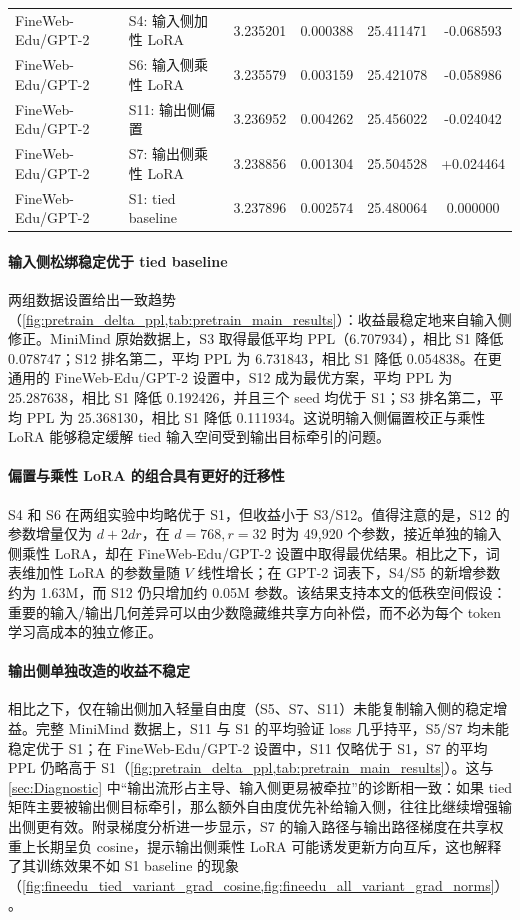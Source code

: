 \documentclass{article}
\theoremstyle{plain}
\theoremstyle{definition}
\theoremstyle{remark}
\begin{document}
\begin{table}[t]
\begin{small}
{\begin{tabular}{llcccc}
FineWeb-Edu/GPT-2 & S4: 输入侧加性 LoRA & 3.235201 & 0.000388 & 25.411471 & -0.068593 \\
FineWeb-Edu/GPT-2 & S6: 输入侧乘性 LoRA & 3.235579 & 0.003159 & 25.421078 & -0.058986 \\
FineWeb-Edu/GPT-2 & S11: 输出侧偏置 & 3.236952 & 0.004262 & 25.456022 & -0.024042 \\
FineWeb-Edu/GPT-2 & S7: 输出侧乘性 LoRA & 3.238856 & 0.001304 & 25.504528 & +0.024464 \\
FineWeb-Edu/GPT-2 & S1: tied baseline & 3.237896 & 0.002574 & 25.480064 & 0.000000 \\
\bottomrule
\end{tabular}
}
\end{small}
\end{table}

\paragraph{输入侧松绑稳定优于 tied baseline}
两组数据设置给出一致趋势（\cref{fig:pretrain_delta_ppl,tab:pretrain_main_results}）：收益最稳定地来自输入侧修正。MiniMind 原始数据上，S3 取得最低平均 PPL（6.707934），相比 S1 降低 0.078747；S12 排名第二，平均 PPL 为 6.731843，相比 S1 降低 0.054838。在更通用的 FineWeb-Edu/GPT-2 设置中，S12 成为最优方案，平均 PPL 为 25.287638，相比 S1 降低 0.192426，并且三个 seed 均优于 S1；S3 排名第二，平均 PPL 为 25.368130，相比 S1 降低 0.111934。这说明输入侧偏置校正与乘性 LoRA 能够稳定缓解 tied 输入空间受到输出目标牵引的问题。

\paragraph{偏置与乘性 LoRA 的组合具有更好的迁移性}
S4 和 S6 在两组实验中均略优于 S1，但收益小于 S3/S12。值得注意的是，S12 的参数增量仅为 $d+2dr$，在 $d=768,r=32$ 时为 49,920 个参数，接近单独的输入侧乘性 LoRA，却在 FineWeb-Edu/GPT-2 设置中取得最优结果。相比之下，词表维加性 LoRA 的参数量随 $V$ 线性增长；在 GPT-2 词表下，S4/S5 的新增参数约为 1.63M，而 S12 仍只增加约 0.05M 参数。该结果支持本文的低秩空间假设：重要的输入/输出几何差异可以由少数隐藏维共享方向补偿，而不必为每个 token 学习高成本的独立修正。

\paragraph{输出侧单独改造的收益不稳定}
相比之下，仅在输出侧加入轻量自由度（S5、S7、S11）未能复制输入侧的稳定增益。完整 MiniMind 数据上，S11 与 S1 的平均验证 loss 几乎持平，S5/S7 均未能稳定优于 S1；在 FineWeb-Edu/GPT-2 设置中，S11 仅略优于 S1，S7 的平均 PPL 仍略高于 S1（\cref{fig:pretrain_delta_ppl,tab:pretrain_main_results}）。这与 \cref{sec:Diagnostic} 中“输出流形占主导、输入侧更易被牵拉”的诊断相一致：如果 tied 矩阵主要被输出侧目标牵引，那么额外自由度优先补给输入侧，往往比继续增强输出侧更有效。附录梯度分析进一步显示，S7 的输入路径与输出路径梯度在共享权重上长期呈负 cosine，提示输出侧乘性 LoRA 可能诱发更新方向互斥，这也解释了其训练效果不如 S1 baseline 的现象（\cref{fig:fineedu_tied_variant_grad_cosine,fig:fineedu_all_variant_grad_norms}）。
\end{document}
